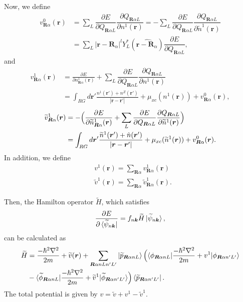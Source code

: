 \documentclass{article}
\begin{document}
Now, we define
\begin{align}
  v^0_{\bm{R}\alpha}(\bm{r}) 
  &= 
  \sum_L 
  \dfrac{\partial E}{\partial Q_{\bm{R}\alpha L}} 
   \dfrac{\partial Q_{\bm{R}\alpha L}}{\partial {n}^1(\bm{r})}
   = 
   -\sum_L 
   \dfrac{\partial E}{\partial Q_{\bm{R}\alpha L}} 
    \dfrac{\partial Q_{\bm{R}\alpha L}}{\partial \widetilde{n}^1(\bm{r})}
    \nonumber
  \\&=
  \sum_L 
  |\bm{r}-\bm{R}_{\alpha}|^l Y^*_L(\widehat{\bm{r} - \bm{R}_{\alpha}})
  \dfrac{\partial E}{\partial Q_{\bm{R}\alpha L}},
\end{align}
and
\begin{align}
  v^1_{\bm{R}\alpha}(\bm{r}) 
  &= 
  \frac{\partial E}{\partial n^1_{\bm{R}\alpha }(\bm{r})}
  +
  \sum_L 
  \dfrac{\partial E}{\partial Q_{\bm{R}\alpha L}} 
   \dfrac{\partial Q_{\bm{R}\alpha L}}{\partial {n}^1(\bm{r})}
  \\&=
  \int_{RG} d\bm{r}' \frac{n^1(\bm{r}') + n^Z(\bm{r}')}{|\bm{r} - \bm{r}'|}
  + \mu_{xc}(n^1(\bm{r})) + v^0_{\bm{R}\alpha}(\bm{r}) ,
\end{align}
\begin{align}
  \widetilde{v}^1_{\bm{R}\alpha}(\bm{r}) 
  &= 
  -\Bigl(
  \frac{\partial E}{\partial \widetilde{n}^1_{\bm{R}\alpha }(\bm{r})}
  +
  \sum_L 
  \dfrac{\partial E}{\partial Q_{\bm{R}\alpha L}} 
   \dfrac{\partial Q_{\bm{R}\alpha L}}{\partial \widetilde{n}^1(\bm{r})}
   \Bigr)
  \\&=
  \int_{RG} d\bm{r}' \frac{\widetilde{n}^1(\bm{r}') + \hat{n}(\bm{r}')}{|\bm{r} - \bm{r}'|}
  + \mu_{xc}(\widetilde{n}^1(\bm{r})) + v^0_{\bm{R}\alpha}(\bm{r}).
\end{align}
In addition, we define
\begin{align}
  &v^1(\bm{r}) = \sum_{\bm{R}\alpha } v^1_{\bm{R}\alpha}(\bm{r})
  \\&
  \widetilde{v}^1(\bm{r}) = \sum_{\bm{R}\alpha } \widetilde{v}^1_{\bm{R}\alpha}(\bm{r}).
\end{align}

Then, the Hamilton operator $\widetilde{H}$, which satisfies
\begin{align}
  \frac{\partial E}{\partial \bra{\widetilde{\psi}_{n\bm{k}}}} = f_{n\bm{k}} \widetilde{H}\ket{\widetilde{\psi}_{n\bm{k}}},
\end{align}
can be calculated as
\begin{align}
  \widetilde{H}
  &=
  \frac{-\hbar^2 \nabla^2}{2m} + \widetilde{v}(\bm{r})
  + 
  \sum_{\bm{R}\alpha nL n'L'}
  \ket{\widetilde{p}_{\bm{R}\alpha nL}}
  \Bigl(
    \braket{\phi_{\bm{R}\alpha nL} | \frac{-\hbar^2 \nabla^2}{2m} + v^1| \phi_{\bm{R}\alpha n'L'}} 
    \nonumber
    \\&- 
    \braket{\widetilde{\phi}_{\bm{R}\alpha nL} | \frac{-\hbar^2 \nabla^2}{2m} + \widetilde{v}^1 | \widetilde{\phi}_{\bm{R}\alpha n'L'}}
  \Bigr)
  \bra{\widetilde{p}_{\bm{R}\alpha n'L'}}.
\end{align}
The total potential is given by $v = \widetilde{v} + v^1 - \widetilde{v}^1$.


\end{document}
